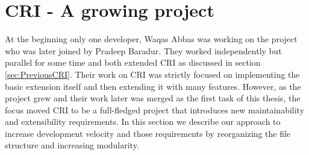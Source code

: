 \section{CRI - A growing project}
At the beginning only one developer, Waqas Abbas was working on the project who was later joined by Pradeep Baradur. They worked independently but parallel for some time and both extended CRI as discussed in section \ref{sec:PreviousCRI}. Their work on CRI was strictly focused on implementing the basic extension itself and then extending it with many features. However, as the project grew and their work later was merged as the first task of this thesis, the focus moved CRI to be a full-fledged project that introduces new maintainability and extensibility requirements. In this section we describe our approach to increase development velocity and those requirements by reorganizing the file structure and increasing modularity.

